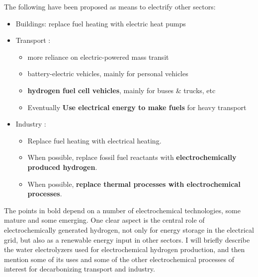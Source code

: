 \vspace{5mm}
The following have been proposed as means to electrify other sectors\cite{EU2018}:
\begin{itemize}
	\item Buildings\cite{David2017}: replace fuel heating with electric heat pumps
	
	\item Transport \cite{Cano2018, Thiel2016}:
	\begin{itemize}
		\item more reliance on electric-powered mass transit
		
		\item battery-electric vehicles, mainly for personal vehicles
		
		\item \textbf{hydrogen fuel cell vehicles}, mainly for buses \& trucks, etc
		
		\item Eventually \textbf{Use electrical energy to make fuels} for heavy transport
	\end{itemize}

	
	\item Industry \cite{Lechtenbohmer2016}:
	\begin{itemize}
		
		\item Replace fuel heating with electrical heating. 
		
		\item When possible, replace fossil fuel reactants with \textbf{electrochemically produced hydrogen}.
		
		\item
		When possible, \textbf{replace thermal processes with electrochemical processes}. 
		
	\end{itemize}
\end{itemize}

The points in bold depend on a number of electrochemical technologies, some mature and some emerging. One clear aspect is the central role of electrochemically generated hydrogen, not only for energy storage in the electrical grid, but also as a renewable energy input in other sectors. 
I will briefly describe the water electrolyzers used for electrochemical hydrogen production, and then mention some of its uses and some of the other electrochemical processes of interest for decarbonizing transport and industry.


